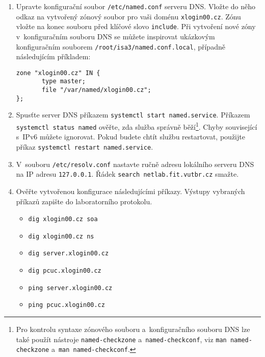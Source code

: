 \documentclass[a4paper,11pt]{article}
\begin{document}
\begin{enumerate}
\item Upravte konfigurační soubor {\tt /etc/named.conf} serveru DNS. Vložte do něho odkaz na vytvořený zónový soubor pro vaši doménu {\tt xlogin00.cz}. Zónu vložte na konec souboru před klíčové slovo {\tt include}. Při vytvoření nové zóny v~konfiguračním souboru DNS se můžete inspirovat ukázkovým konfiguračním souborem {\tt /root/isa3/named.conf.local}, případně následujícím příkladem:
\begin{verbatim}
zone "xlogin00.cz" IN {
       type master;
       file "/var/named/xlogin00.cz";
};
\end{verbatim}
  \item Spusťte server DNS příkazem {\tt systemctl start named.service}. Příkazem {\tt systemctl status named} ověřte, zda služba správně běží\footnote{Pro kontrolu syntaxe zónového souboru a~konfiguračního souboru DNS lze také použít nástroje {\tt named-checkzone} a~{\tt named-checkconf}, viz {\tt man named-checkzone} a~{\tt man named-checkconf}.}. Chyby související s~IPv6 můžete ignorovat. Pokud budete chtít službu restartovat, použijte příkaz {\tt systemctl restart named.service}.

  \item V~souboru {\tt /etc/resolv.conf} nastavte ručně adresu lokálního serveru DNS na IP adresu {\tt 127.0.0.1}. Řádek {\tt search netlab.fit.vutbr.cz} smažte.
  \item Ověřte vytvořenou konfigurace následujícími příkazy. Výstupy vybraných příkazů zapište do laboratorního protokolu.
    \begin{itemize}
        \item {\tt dig xlogin00.cz soa}
        \item {\tt dig xlogin00.cz ns}
        \item {\tt dig server.xlogin00.cz}
        \item {\tt dig pcuc.xlogin00.cz}
        \item {\tt ping server.xlogin00.cz}
        \item {\tt ping pcuc.xlogin00.cz}
    \end{itemize}


\end{enumerate}
\end{document}
